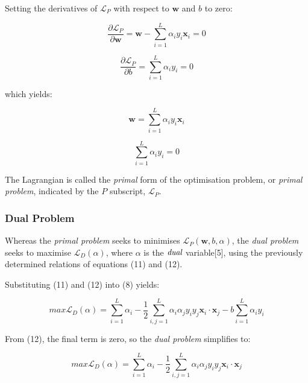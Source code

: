 \documentclass[10pt, a4paper,reqno]{amsart}
\begin{document}
Setting the derivatives of $\mathcal{L}_P$ with respect to $\mathbf{w}$ and $b$ to zero:

\begin{equation}
\frac{\partial \mathcal{L}_P}{\partial \mathbf{w}} = \mathbf{w} -  \sum_{i=1}^{L}\alpha_i y_i \mathbf{x}_i = 0
\end{equation}
 
\begin{equation}
\frac{\partial \mathcal{L}_P}{\partial b} = \sum_{i=1}^{L}\alpha_i y_i = 0
\end{equation}

which yields:

\begin{equation}
\mathbf{w} = \sum_{i=1}^{L}\alpha_i y_i \mathbf{x}_i
\end{equation}

\begin{equation}
\sum_{i=1}^{L}\alpha_i y_i = 0
\end{equation}

The Lagrangian is called the \emph{primal} form of the optimisation problem, or \emph{primal problem}, indicated by the $P$ subscript, $\mathcal{L}_P$.

\subsubsection{Dual Problem}

Whereas the \emph{primal problem} seeks to minimises $\mathcal{L}_P(\mathbf{w}, b, \alpha)$, the \emph{dual problem} seeks to maximise $\mathcal{L}_D(\alpha)$, where $\alpha$ is the $\emph{dual}$ variable[5], using the previously determined relations of equations (11) and (12).

Substituting (11) and (12) into (8) yields:

\begin{equation}
max\mathcal{L}_D(\alpha) = \sum_{i=1}^{L}\alpha_i - \frac{1}{2}\sum_{i,j=1}^{L}\alpha_i \alpha_j y_i y_j\mathbf{x}_i\cdot\mathbf{x}_j - b\sum_{i=1}^{L}\alpha_i y_i
\end{equation}

From (12), the final term is zero, so the \emph{dual problem} simplifies to:

\begin{equation}
max\mathcal{L}_D(\alpha) = \sum_{i=1}^{L}\alpha_i - \frac{1}{2}\sum_{i,j=1}^{L}\alpha_i \alpha_j y_i y_j\mathbf{x}_i\cdot\mathbf{x}_j
\end{equation}
\end{document}
